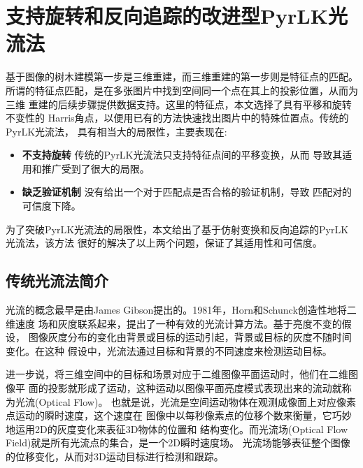 
\chapter{支持旋转和反向追踪的改进型PyrLK光流法}
\label{cha:pyrlk}
基于图像的树木建模第一步是三维重建，而三维重建的第一步则是特征点的匹配。
所谓的特征点匹配，是在多张图片中找到空间同一个点在其上的投影位置，从而为三维
重建的后续步骤提供数据支持。这里的特征点，本文选择了具有平移和旋转不变性的
Harris角点，以便用已有的方法快速找出图片中的特殊位置点。传统的PyrLK光流法，
具有相当大的局限性，主要表现在:\\
\begin{itemize}
	\item \textbf{不支持旋转} 传统的PyrLK光流法只支持特征点间的平移变换，从而
		导致其适用和推广受到了很大的局限。
	\item \textbf{缺乏验证机制} 没有给出一个对于匹配点是否合格的验证机制，导致
		匹配对的可信度下降。
\end{itemize}

为了突破PyrLK光流法的局限性，本文给出了基于仿射变换和反向追踪的PyrLK光流法，该方法
很好的解决了以上两个问题，保证了其适用性和可信度。

%

\section{传统光流法简介}
光流的概念最早是由James Gibson提出的。1981年，Horn和Schunck创造性地将二维速度
场和灰度联系起来，提出了一种有效的光流计算方法\cite{horn}。基于亮度不变的假设，
图像灰度分布的变化由背景或目标的运动引起，背景或目标的灰度不随时间变化。在这种
假设中，光流法通过目标和背景的不同速度来检测运动目标。

进一步说，将三维空间中的目标和场景对应于二维图像平面运动时，他们在二维图像平
面的投影就形成了运动，这种运动以图像平面亮度模式表现出来的流动就称为光流(Optical Flow)。
也就是说，光流是空间运动物体在观测成像面上对应像素点运动的瞬时速度，这个速度在
图像中以每秒像素点的位移个数来衡量，它巧妙地运用2D的灰度变化来表征3D物体的位置和
结构变化。而光流场(Optical Flow Field)就是所有光流点的集合，是一个2D瞬时速度场。
光流场能够表征整个图像的位移变化，从而对3D运动目标进行检测和跟踪。

